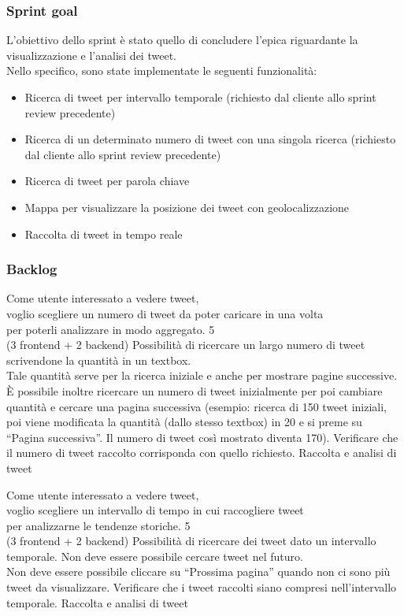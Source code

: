 \subsubsection{Sprint goal}
L'obiettivo dello sprint è stato quello di concludere l'epica riguardante la visualizzazione e l'analisi dei tweet.\\
Nello specifico, sono state implementate le seguenti funzionalità:
\begin{itemize}
    \item Ricerca di tweet per intervallo temporale (richiesto dal cliente allo sprint review precedente)
    \item Ricerca di un determinato numero di tweet con una singola ricerca (richiesto dal cliente allo sprint review precedente)
    \item Ricerca di tweet per parola chiave
    \item Mappa per visualizzare la posizione dei tweet con geolocalizzazione
    \item Raccolta di tweet in tempo reale
\end{itemize}


\subsubsection{Backlog}
\userstory%
{Come utente interessato a vedere tweet,\\voglio scegliere un numero di tweet da poter caricare in una volta\\per poterli analizzare in modo aggregato.}%
{5\\(3 frontend + 2 backend)}%
{Possibilità di ricercare un largo numero di tweet scrivendone la quantità in un textbox.\\
Tale quantità serve per la ricerca iniziale e anche per mostrare pagine successive. 
È possibile inoltre ricercare un numero di tweet inizialmente per poi cambiare quantità e cercare una pagina successiva 
(esempio: ricerca di 150 tweet iniziali, poi viene modificata la quantità (dallo stesso textbox) in 20 e si preme su “Pagina successiva”. Il numero di tweet così mostrato diventa 170).}%
{Verificare che il numero di tweet raccolto corrisponda con quello richiesto.}
{Raccolta e analisi di tweet}

\userstory%
{Come utente interessato a vedere tweet,\\voglio scegliere un intervallo di tempo in cui raccogliere tweet\\per analizzarne le tendenze storiche.}%
{5\\(3 frontend + 2 backend)}%
{Possibilità di ricercare dei tweet dato un intervallo temporale. Non deve essere possibile cercare tweet nel futuro.\\
Non deve essere possibile cliccare su “Prossima pagina” quando non ci sono più tweet da visualizzare.}%
{Verificare che i tweet raccolti siano compresi nell'intervallo temporale.}
{Raccolta e analisi di tweet}

